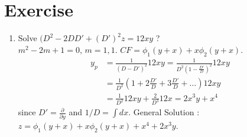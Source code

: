 \section*{Exercise}
\begin{enumerate}
	\item Solve $(D^2 - 2DD' +(D')^2z = 12xy$ ?\\
		$m^2 -2m + 1 = 0$, $m = 1,1$.
		$CF = \phi_1(y+x) + x\phi_2(y+x)$.
		\begin{align*} y_p & = \frac{1}{(D-D')^2} 12xy = \frac{1}{D^2(1-\frac{D'}{D})^2} 12xy \\ 
		&= \frac{1}{D^2} (1+2\frac{D'}{D}+3\frac{D'}{D}+\dots) 12xy \\ 
		&= \frac{1}{D^2}12xy + \frac{2}{D^3} 12x = 2x^3y + x^4 \end{align*}
		since $D' = \frac{\partial }{\partial y}$ and $1/D = \int dx$.
		General Solution : $z = \phi_1(y+x) + x\phi_2(y+x) + x^4 + 2x^3y$.
\end{enumerate}	
